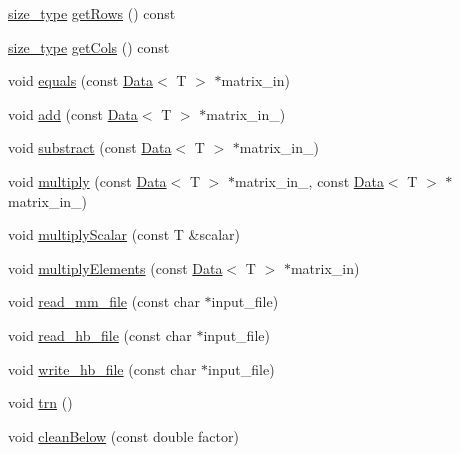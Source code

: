 \begin{DoxyCompactItemize}
\item 
\hyperlink{lmx__mat__data_8h_a49b489a408a211a90e766329c0732d7b}{size\-\_\-type} \hyperlink{classlmx_1_1Type__gmm__sparse_aeb026bfdaec9ab85e2048532963bf208}{get\-Rows} () const 
\item 
\hyperlink{lmx__mat__data_8h_a49b489a408a211a90e766329c0732d7b}{size\-\_\-type} \hyperlink{classlmx_1_1Type__gmm__sparse_a040c71d37e00afa863e4d6572e5573c1}{get\-Cols} () const 
\item 
void \hyperlink{classlmx_1_1Type__gmm__sparse_a9d99bdf0792dca176d2be85bf131f27b}{equals} (const \hyperlink{classlmx_1_1Data}{Data}$<$ T $>$ $\ast$matrix\-\_\-in)
\item 
void \hyperlink{classlmx_1_1Type__gmm__sparse_a999e97cb37c1d3d1b23b3d72f31020fb}{add} (const \hyperlink{classlmx_1_1Data}{Data}$<$ T $>$ $\ast$matrix\-\_\-in\-\_)
\item 
void \hyperlink{classlmx_1_1Type__gmm__sparse_ac79aa5d79a95282a1377eb8de9fbe694}{substract} (const \hyperlink{classlmx_1_1Data}{Data}$<$ T $>$ $\ast$matrix\-\_\-in\-\_)
\item 
void \hyperlink{classlmx_1_1Type__gmm__sparse_a81c1863c5a35508203ed5df0a05e5ba1}{multiply} (const \hyperlink{classlmx_1_1Data}{Data}$<$ T $>$ $\ast$matrix\-\_\-in\-\_, const \hyperlink{classlmx_1_1Data}{Data}$<$ T $>$ $\ast$matrix\-\_\-in\-\_)
\item 
void \hyperlink{classlmx_1_1Type__gmm__sparse_a8ba6a31462827aabd07532ecb8d497dc}{multiply\-Scalar} (const T \&scalar)
\item 
void \hyperlink{classlmx_1_1Type__gmm__sparse_acce4fbd2a3044993641894e300580a60}{multiply\-Elements} (const \hyperlink{classlmx_1_1Data}{Data}$<$ T $>$ $\ast$matrix\-\_\-in)
\item 
void \hyperlink{classlmx_1_1Type__gmm__sparse_a1fdc8733b30705aac2d86a43c4edfa1d}{read\-\_\-mm\-\_\-file} (const char $\ast$input\-\_\-file)
\item 
void \hyperlink{classlmx_1_1Type__gmm__sparse_abd3bbdfd7c363a438edb65a6dedba1c2}{read\-\_\-hb\-\_\-file} (const char $\ast$input\-\_\-file)
\item 
void \hyperlink{classlmx_1_1Type__gmm__sparse_ae5dedc139e0e75c851b11022226c35f4}{write\-\_\-hb\-\_\-file} (const char $\ast$input\-\_\-file)
\item 
void \hyperlink{classlmx_1_1Type__gmm__sparse_af8756bbdf946d35e9130d921785f7dc9}{trn} ()
\item 
void \hyperlink{classlmx_1_1Type__gmm__sparse_a35b68a45ba1cf703e93d2ba49ecb6807}{clean\-Below} (const double factor)

\end{DoxyCompactItemize}

